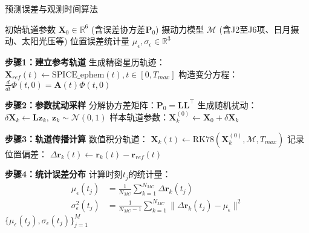 \begin{algorithm}[H]
\caption{预测误差与观测时间算法}
\label{alg:propagation}
\begin{algorithmic}[1]
\Require 
\Statex 初始轨道参数 $\mathbf{X}_0 \in \mathbb{R}^6$ (含误差协方差$\mathbf{P}_0$)
\Statex 摄动力模型 $\mathcal{M}$ (含J2至J6项、日月摄动、太阳光压等)
\Ensure
\Statex 位置误差统计量 $\mu_{\epsilon},\sigma_{\epsilon} \in \mathbb{R}^3$

\State \textbf{步骤1：建立参考轨道}
\State 生成精密星历轨迹：
\quad $\mathbf{X}_{ref}(t) \gets \text{SPICE\_ephem}(t), t\in[0,T_{max}]$
\State 构造变分方程：
\quad $\frac{d}{dt}\Phi(t,0) = \mathbf{A}(t)\Phi(t,0)$

\State \textbf{步骤2：参数扰动采样}
\State 分解协方差矩阵：$\mathbf{P}_0 = \mathbf{L}\mathbf{L}^\top$ 
    \State 生成随机扰动：$\delta\mathbf{X}_k \gets \mathbf{L}\mathbf{z}_k,\ \mathbf{z}_k \sim \mathcal{N}(0,1)$
    \State 样本轨道参数：$\mathbf{X}_k^{(0)} \gets \mathbf{X}_0 + \delta\mathbf{X}_k$
\EndFor

\State \textbf{步骤3：轨道传播计算}
    \State 数值积分轨道：
    \quad $\mathbf{X}_k(t) \gets \text{RK78}(\mathbf{X}_k^{(0)}, \mathcal{M}, T_{max})$
    \State 记录位置偏差：
    \quad $\Delta\mathbf{r}_k(t) \gets \mathbf{r}_k(t) - \mathbf{r}_{ref}(t)$
\EndFor

\State \textbf{步骤4：统计误差分布}
\State 计算时刻$t_j$的统计量：
\begin{align*}
\mu_{\epsilon}(t_j) &= \frac{1}{N_{MC}}\sum_{k=1}^{N_{MC}} \Delta\mathbf{r}_k(t_j) \\
\sigma_{\epsilon}^2(t_j) &= \frac{1}{N_{MC}-1}\sum_{k=1}^{N_{MC}} \|\Delta\mathbf{r}_k(t_j) - \mu_{\epsilon}\|^2
\end{align*}
\State \Return $\{\mu_{\epsilon}(t_j), \sigma_{\epsilon}(t_j)\}_{j=1}^M$
\EndProcedure
\end{algorithmic}
\end{algorithm}


